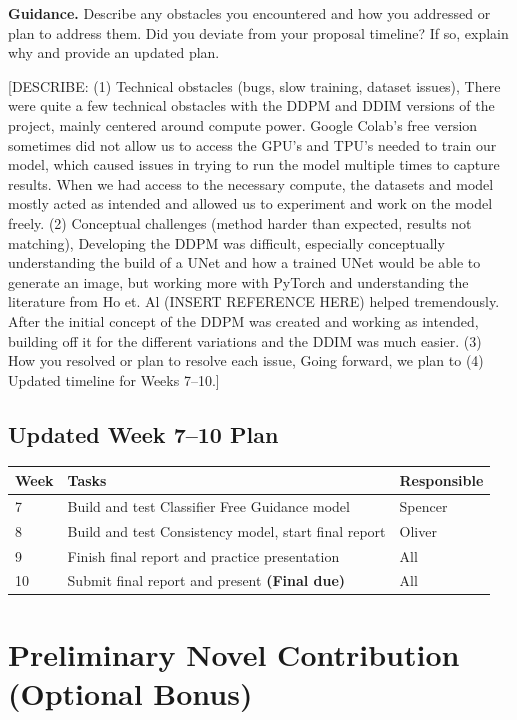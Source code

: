 \documentclass[11pt, letterpaper]{article}
\begin{document}
\begin{guidancebox}
\textbf{Guidance.} Describe any obstacles you encountered and how you
addressed or plan to address them. Did you deviate from your proposal timeline?
If so, explain why and provide an updated plan.
\end{guidancebox}

[DESCRIBE: (1) Technical obstacles (bugs, slow training, dataset issues),
There were quite a few technical obstacles with the DDPM and DDIM versions of the project, mainly centered around compute power. Google Colab's free version sometimes did not allow us to access the GPU's and TPU's needed to train our model, which caused issues in trying to run the model multiple times to capture results. When we had access to the necessary compute, the datasets and model mostly acted as intended and allowed us to experiment and work on the model freely.
(2) Conceptual challenges (method harder than expected, results not matching),
Developing the DDPM was difficult, especially conceptually understanding the build of a UNet and how a trained UNet would be able to generate an image, but working more with PyTorch and understanding the literature from Ho et. Al (INSERT REFERENCE HERE) helped tremendously. After the initial concept of the DDPM was created and working as intended, building off it for the different variations and the DDIM was much easier.
(3) How you resolved or plan to resolve each issue,
Going forward, we plan to 
(4) Updated timeline for Weeks 7--10.]

\subsection{Updated Week 7--10 Plan}

\begin{tabular}{lp{8cm}l}
\toprule
\textbf{Week} & \textbf{Tasks} & \textbf{Responsible} \\
\midrule
7 & Build and test Classifier Free Guidance model & Spencer \\
8 & Build and test Consistency model, start final report & Oliver \\
9 & Finish final report and practice presentation & All \\
10 & Submit final report and present \textbf{(Final due)} & All \\
\bottomrule
\end{tabular}

\section{Preliminary Novel Contribution (Optional Bonus)}
\end{document}
